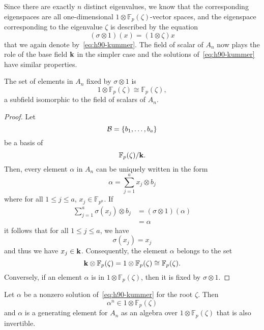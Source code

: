 Since there are exactly $n$ distinct eigenvalues, we know that the
corresponding eigenspaces are all one-dimensional
$1\otimes\mathbb{F}_{p}(\zeta)$-vector spaces, and the eigenspace corresponding
to the eigenvalue $\zeta$ is described by the equation
 \begin{equation}
   \tag{H90}
   (\sigma\otimes1)(x) = (1\otimes\zeta) x
   \label{eq:h90-kummer}
 \end{equation}
 that we again denote by~\eqref{eq:h90-kummer}. The field of scalar of $A_n$ now
 plays the role of the base field $\mathbf{k}$ in the simpler case and the solutions
 of~\eqref{eq:h90-kummer} have similar properties.
 \begin{lm}
   \label{lm:fixed-elems}
   The set of elements in $A_n$ fixed by $\sigma\otimes1$ is
   \[
     1\otimes\mathbb{F}_{p}(\zeta)\cong \mathbb{F}_{p}(\zeta),
   \]
   a subfield isomorphic to the field of scalars of $A_n$.
 \end{lm}
 \begin{proof}
   Let 
   \[
     \mathcal{B} = \left\{ b_1, \dots, b_a \right\}
   \]
   be a basis of
   \[
     \mathbb{F}_p(\zeta)/\mathbf{k}.
   \]
   Then, every element $\alpha$ in $A_n$ can be uniquely written in the form
   \[
     \alpha = \sum_{j=1}^a x_j\otimes b_j
   \]
   where for all $1\leq j\leq a$, $x_j\in\mathbb{F}_{p^n}$. If 
   \begin{align*}
     \sum_{j=1}^a\sigma(x_j)\otimes b_j &= (\sigma\otimes1)(\alpha)\\
     &= \alpha
   \end{align*}
 it follows that for all $1\leq j\leq a$, we have
   \[
     \sigma(x_j) = x_j
   \]
   and thus we have $x_j\in\mathbf{k}$. Consequently, the element $\alpha$ belongs to
   the set
   \[
     \mathbf{k}\otimes\mathbb{F}_{p}(\zeta) =
     1\otimes\mathbb{F}_p(\zeta)\cong\mathbb{F}_p(\zeta).
   \]
   Conversely, if an element $\alpha$ is in $1\otimes\mathbb{F}_{p}(\zeta)$,
   then it is fixed by $\sigma\otimes1$.
 \end{proof}
 \begin{lm}
   Let $\alpha$ be a nonzero solution of~\eqref{eq:h90-kummer} for the root
   $\zeta$. Then 
   \[
     \alpha^n\in 1\otimes\mathbb{F}_{p}(\zeta)
   \]
   and $\alpha$ is a generating element for $A_n$ as an algebra over
   $1\otimes\mathbb{F}_{p}(\zeta)$ that is also invertible.
 \end{lm}
